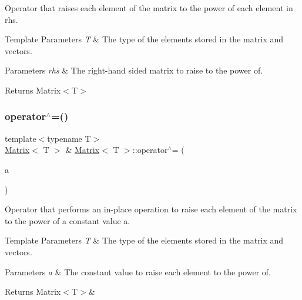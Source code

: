 Operator that raises each element of the matrix to the power of each element in {\ttfamily rhs}. 


\begin{DoxyTemplParams}{Template Parameters}
{\em T} & The type of the elements stored in the matrix and vectors. \\
\hline
\end{DoxyTemplParams}

\begin{DoxyParams}{Parameters}
{\em rhs} & The right-\/hand sided matrix to raise to the power of. \\
\hline
\end{DoxyParams}
\begin{DoxyReturn}{Returns}
Matrix$<$\+T$>$ 
\end{DoxyReturn}
\mbox{\label{classMatrix_af35faeb39342bf42c4470cf10630e32f}} 
\subsubsection{\texorpdfstring{operator$^\wedge$=()}{operator^=()}\hspace{0.1cm}{\footnotesize\ttfamily [2/2]}}
{\footnotesize\ttfamily template$<$typename T$>$ \\
\mbox{\hyperlink{classMatrix}{Matrix}}$<$ T $>$ \& \mbox{\hyperlink{classMatrix}{Matrix}}$<$ T $>$\+::operator$^\wedge$= (\begin{DoxyParamCaption}\item[{const T \&}]{a }\end{DoxyParamCaption})\hspace{0.3cm}{\ttfamily [inline]}}



Operator that performs an in-\/place operation to raise each element of the matrix to the power of a constant value {\ttfamily a}. 


\begin{DoxyTemplParams}{Template Parameters}
{\em T} & The type of the elements stored in the matrix and vectors. \\
\hline
\end{DoxyTemplParams}

\begin{DoxyParams}{Parameters}
{\em a} & The constant value to raise each element to the power of. \\
\hline
\end{DoxyParams}
\begin{DoxyReturn}{Returns}
Matrix$<$\+T$>$\& 
\end{DoxyReturn}
\mbox{\label{classMatrix_a8d10454cfe9427269b54a754262004b8}} 
